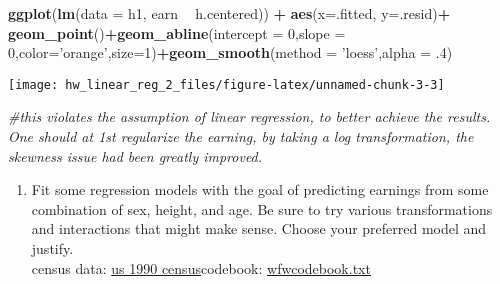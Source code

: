 \documentclass[]{article}
\newenvironment{Shaded}{\begin{snugshade}}{\end{snugshade}}
\newcommand{\CommentTok}[1]{\textcolor[rgb]{0.56,0.35,0.01}{\textit{#1}}}
\newcommand{\DataTypeTok}[1]{\textcolor[rgb]{0.13,0.29,0.53}{#1}}
\newcommand{\DecValTok}[1]{\textcolor[rgb]{0.00,0.00,0.81}{#1}}
\newcommand{\FloatTok}[1]{\textcolor[rgb]{0.00,0.00,0.81}{#1}}
\newcommand{\KeywordTok}[1]{\textcolor[rgb]{0.13,0.29,0.53}{\textbf{#1}}}
\newcommand{\NormalTok}[1]{#1}
\newcommand{\OperatorTok}[1]{\textcolor[rgb]{0.81,0.36,0.00}{\textbf{#1}}}
\newcommand{\StringTok}[1]{\textcolor[rgb]{0.31,0.60,0.02}{#1}}
\providecommand{\tightlist}{%
  \setlength{\itemsep}{0pt}\setlength{\parskip}{0pt}}
\begin{document}
\begin{Shaded}
\begin{Highlighting}[]
\KeywordTok{ggplot}\NormalTok{(}\KeywordTok{lm}\NormalTok{(}\DataTypeTok{data =}\NormalTok{ h1, earn }\OperatorTok{~}\StringTok{ }\NormalTok{h.centered)) }\OperatorTok{+}\StringTok{ }\KeywordTok{aes}\NormalTok{(}\DataTypeTok{x=}\NormalTok{.fitted, }\DataTypeTok{y=}\NormalTok{.resid)}\OperatorTok{+}
\StringTok{  }\KeywordTok{geom_point}\NormalTok{()}\OperatorTok{+}\KeywordTok{geom_abline}\NormalTok{(}\DataTypeTok{intercept =} \DecValTok{0}\NormalTok{,}\DataTypeTok{slope =} \DecValTok{0}\NormalTok{,}\DataTypeTok{color=}\StringTok{'orange'}\NormalTok{,}\DataTypeTok{size=}\DecValTok{1}\NormalTok{)}\OperatorTok{+}\KeywordTok{geom_smooth}\NormalTok{(}\DataTypeTok{method =} \StringTok{'loess'}\NormalTok{,}\DataTypeTok{alpha =} \FloatTok{.4}\NormalTok{)}
\end{Highlighting}
\end{Shaded}

\begin{center}\texttt{[image: hw\_linear\_reg\_2\_files/figure-latex/unnamed-chunk-3-3]} \end{center}

\begin{Shaded}
\begin{Highlighting}[]
\CommentTok{#this violates the assumption of linear regression, to better achieve the results. One should at 1st regularize the earning, by taking a log transformation, the skewness issue had been greatly improved.}
\end{Highlighting}
\end{Shaded}

\begin{enumerate}
\def\labelenumi{\arabic{enumi}.}
\setcounter{enumi}{2}
\tightlist
\item
  Fit some regression models with the goal of predicting earnings from
  some combination of sex, height, and age. Be sure to try various
  transformations and interactions that might make sense. Choose your
  preferred model and justify.\\
  census data:
  \href{https://www2.census.gov/library/publications/decennial/1990/cp-1/cp-1-1.pdf\#}{us
  1990 census}\newline codebook:
  \href{http://www.stat.columbia.edu/~gelman/arm/examples/earnings/wfwcodebook.txt}{wfwcodebook.txt}\newline
\end{enumerate}
\end{document}
